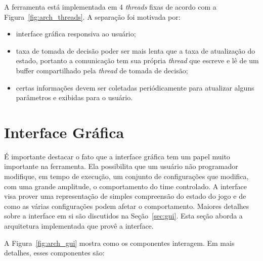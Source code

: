 A ferramenta está implementada em 4 \textit{threads} fixas de acordo com a
Figura~\ref{fig:arch_threads}.  A separação foi motivada por:

\begin{itemize}
  \item interface gráfica responsiva ao usuário;
  \item taxa de tomada de decisão poder ser mais lenta que a taxa de
    atualização do estado, portanto a comunicação tem sua própria
    \textit{thread} que escreve e lê de um buffer compartilhado pela
    \textit{thread} de tomada de decisão;
  \item certas informações devem ser coletadas periódicamente para atualizar
    alguns parâmetros e exibidas para o usuário.
\end{itemize}

\section{Interface Gráfica}

É importante destacar o fato que a interface gráfica tem um papel muito
importante na ferramenta.  Ela possibilita que um usuário não programador
modifique, em tempo de execução, um conjunto de configurações que modifica, com
uma grande amplitude, o comportamento do time controlado.  A interface visa
prover uma representação de simples compreensão do estado do jogo e de como as
várias configurações podem afetar o comportamento.  Maiores detalhes sobre a
interface em si são discutidos na Seção~\ref{sec:gui}.  Esta seção aborda
a arquitetura implementada que provê a interface.

A Figura~\ref{fig:arch_gui} mostra como os componentes interagem.  Em mais
detalhes, esses componentes são:

